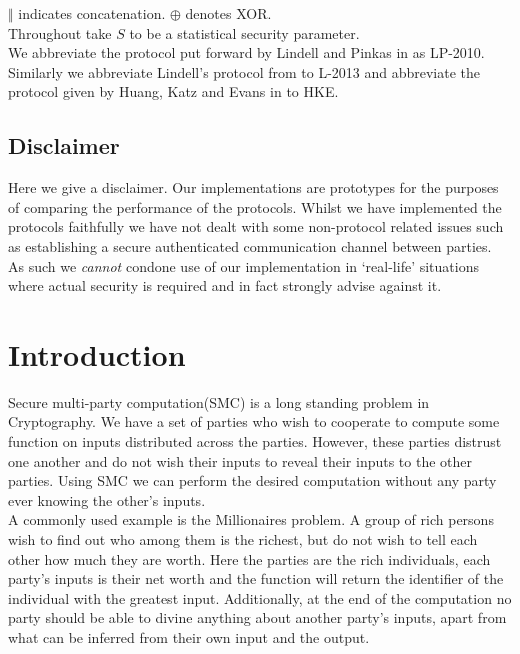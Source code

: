 \documentclass[ %
                    author={Nicholas Tutte},
                supervisor={Prof. Nigel Smart},
                    degree={MEng},
                     title={Secure Two Party Computation},
                  subtitle={A practical comparison of recent protocols},
                      type={Research - GG1K},
                      year={2015} ]{dissertation}
\begin{document}
			$\Vert$ indicates concatenation. $\oplus$ denotes XOR.\\

			Throughout take $S$ to be a statistical security parameter.\\

			We abbreviate the protocol put forward by Lindell and Pinkas in \cite{LindellAndPinkas2011} as LP-2010. Similarly we abbreviate Lindell's protocol from \cite{Lindell_CnC_2013} to L-2013 and abbreviate the protocol given by Huang, Katz and Evans in \cite{Katz_Symm_CnC_2013} to HKE.

		\section*{Disclaimer}
			Here we give a disclaimer. Our implementations are prototypes for the purposes of comparing the performance of the protocols. Whilst we have implemented the protocols faithfully we have not dealt with some non-protocol related issues such as establishing a secure authenticated communication channel between parties.\\

			As such we \emph{cannot} condone use of our implementation in `real-life' situations where actual security is required and in fact strongly advise against it.

	\tableofcontents

	\chapter{Introduction}
		\setcounter{page}{1}

		Secure multi-party computation(SMC) is a long standing problem in Cryptography. We have a set of parties who wish to cooperate to compute some function on inputs distributed across the parties. However, these parties distrust one another and do not wish their inputs to reveal their inputs to the other parties. Using SMC we can perform the desired computation without any party ever knowing the other's inputs.\\

		A commonly used example is the Millionaires problem. A group of rich persons wish to find out who among them is the richest, but do not wish to tell each other how much they are worth. Here the parties are the rich individuals, each party's inputs is their net worth and the function will return the identifier of the individual with the greatest input. Additionally, at the end of the computation no party should be able to divine anything about another party's inputs, apart from what can be inferred from their own input and the output.\\
\end{document}
